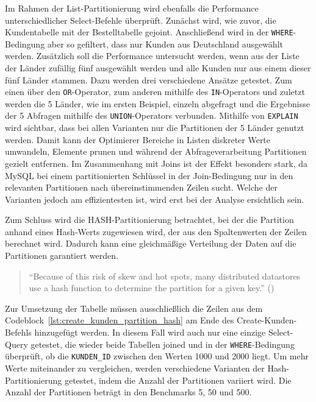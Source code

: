 \vspace{-5pt}

\vspace{-5pt}

Im Rahmen der List-Partitionierung wird ebenfalls die Performance unterschiedlicher Select-Befehle überprüft.
Zunächst wird, wie zuvor, die Kundentabelle mit der Bestelltabelle gejoint.
Anschließend wird in der \texttt{WHERE}-Bedingung aber so gefiltert, dass nur Kunden aus Deutschland ausgewählt werden.
Zusätzlich soll die Performance untersucht werden, wenn aus der Liste der Länder zufällig fünf ausgewählt werden und alle Kunden nur aus einem dieser fünf Länder stammen.
Dazu werden drei verschiedene Ansätze getestet.
Zum einen über den \texttt{OR}-Operator, zum anderen mithilfe des \texttt{IN}-Operators und zuletzt werden die 5 Länder, wie im ersten Beispiel, einzeln abgefragt und die Ergebnisse der 5 Abfragen mithilfe des \texttt{UNION}-Operators verbunden.
Mithilfe von \texttt{EXPLAIN} wird sichtbar, dass bei allen Varianten nur die Partitionen der 5 Länder genutzt werden.
Damit kann der Optimierer Bereiche in Listen diskreter Werte umwandeln, Elemente prunen und während der Abfrageverarbeitung Partitionen gezielt entfernen.
Im Zusammenhang mit Joins ist der Effekt besonders stark, da MySQL bei einem partitionierten Schlüssel in der Join-Bedingung nur in den relevanten Partitionen nach übereinstimmenden Zeilen sucht.
Welche der Varianten jedoch am effizientesten ist, wird erst bei der Analyse ersichtlich sein.

Zum Schluss wird die HASH-Partitionierung betrachtet, bei der die Partition anhand eines Hash-Werts zugewiesen wird, der aus den Spaltenwerten der Zeilen berechnet wird.
Dadurch kann eine gleichmäßige Verteilung der Daten auf die Partitionen garantiert werden.

\begin{quote}
	\enquote{Because of this risk of skew and hot spots, many distributed datastores use a hash function to determine the partition for a given key.} (\cite[S. 203]{kleppmann2017designing})
\end{quote}

Zur Umsetzung der Tabelle müssen ausschließlich die Zeilen aus dem Codeblock~\ref{lst:create_kunden_partition_hash} am Ende des Create-Kunden-Befehls hinzugefügt werden.
In diesem Fall wird auch nur eine einzige Select-Query getestet, die wieder beide Tabellen joined und in der \texttt{WHERE}-Bedingung überprüft, ob die \texttt{KUNDEN\_ID} zwischen den Werten 1000 und 2000 liegt.
Um mehr Werte miteinander zu vergleichen, werden verschiedene Varianten der Hash-Partitionierung getestet, indem die Anzahl der Partitionen variiert wird.
Die Anzahl der Partitionen beträgt in den Benchmarks 5, 50 und 500.

